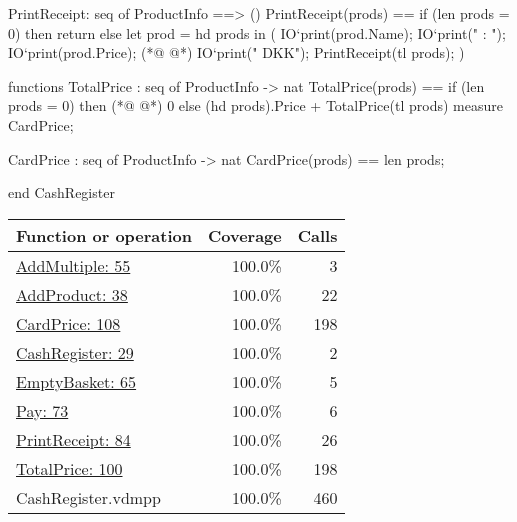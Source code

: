 \begin{vdmpp}
 PrintReceipt: seq of ProductInfo ==> ()
 PrintReceipt(prods) ==
  if (len prods = 0) then
   return
  else
   let prod = hd prods
    in 
    (
     IO`print(prod.Name);
     IO`print(" : ");
     IO`print(prod.Price);
(*@
\label{TotalPrice:100}
@*)
     IO`print(" DKK\n");
     PrintReceipt(tl prods);
    )
   
functions
 TotalPrice : seq of ProductInfo -> nat
 TotalPrice(prods) == 
  if (len prods = 0) then
(*@
\label{CardPrice:108}
@*)
   0
  else
   (hd prods).Price + TotalPrice(tl prods)
  measure CardPrice;
  
 CardPrice : seq of ProductInfo -> nat
 CardPrice(prods) ==
  len prods; 
  
end CashRegister
\end{vdmpp}
\bigskip
\begin{longtable}{|l|r|r|}
\hline
Function or operation & Coverage & Calls \\
\hline
\hline
\hyperref[AddMultiple:55]{AddMultiple: 55} & 100.0\% & 3 \\
\hline
\hyperref[AddProduct:38]{AddProduct: 38} & 100.0\% & 22 \\
\hline
\hyperref[CardPrice:108]{CardPrice: 108} & 100.0\% & 198 \\
\hline
\hyperref[CashRegister:29]{CashRegister: 29} & 100.0\% & 2 \\
\hline
\hyperref[EmptyBasket:65]{EmptyBasket: 65} & 100.0\% & 5 \\
\hline
\hyperref[Pay:73]{Pay: 73} & 100.0\% & 6 \\
\hline
\hyperref[PrintReceipt:84]{PrintReceipt: 84} & 100.0\% & 26 \\
\hline
\hyperref[TotalPrice:100]{TotalPrice: 100} & 100.0\% & 198 \\
\hline
\hline
CashRegister.vdmpp & 100.0\% & 460 \\
\hline
\end{longtable}

